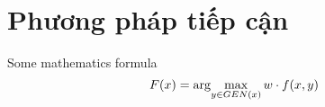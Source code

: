 \chapter{Phương pháp tiếp cận}

Some mathematics formula $$F(x) = \arg\!\max_{y \in GEN(x)} w \cdot f(x, y)$$
